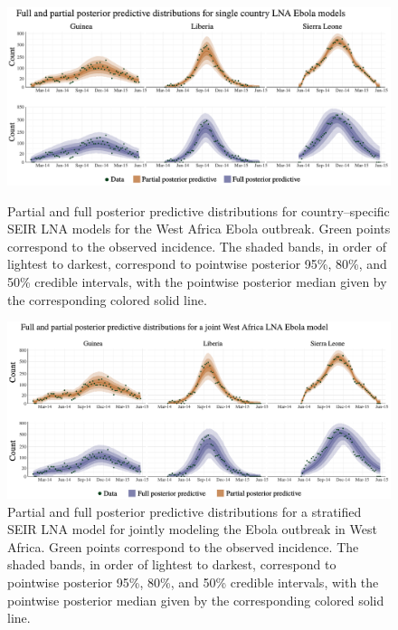 \begin{figure}[htbp] 
		\centering
		\includegraphics[width=0.9\linewidth]{figures/ebola_single_postpreds_lna}
		\caption[Posterior predictive distributions for country--specific SEIR LNA models for the West Africa Ebola outbreak.]{Partial and full posterior predictive distributions for country--specific SEIR LNA models for the West Africa Ebola outbreak. Green points correspond to the observed incidence. The shaded bands, in order of lightest to darkest, correspond to pointwise posterior 95\%, 80\%, and 50\% credible intervals, with the pointwise posterior median given by the corresponding colored solid line.}
		\label{fig:ebola_single_postpreds}
		
		\includegraphics[width=0.9\linewidth]{figures/ebola_joint_postpreds_lna}
		\caption[Posterior predictive distributions for a stratified SEIR LNA model for the West Africa Ebola outbreak.]{Partial and full posterior predictive distributions for a stratified SEIR LNA model for jointly modeling the Ebola outbreak in West Africa. Green points correspond to the observed incidence. The shaded bands, in order of lightest to darkest, correspond to pointwise posterior 95\%, 80\%, and 50\% credible intervals, with the pointwise posterior median given by the corresponding colored solid line.}
		\label{fig:ebola_joint_postpreds}
\end{figure}

